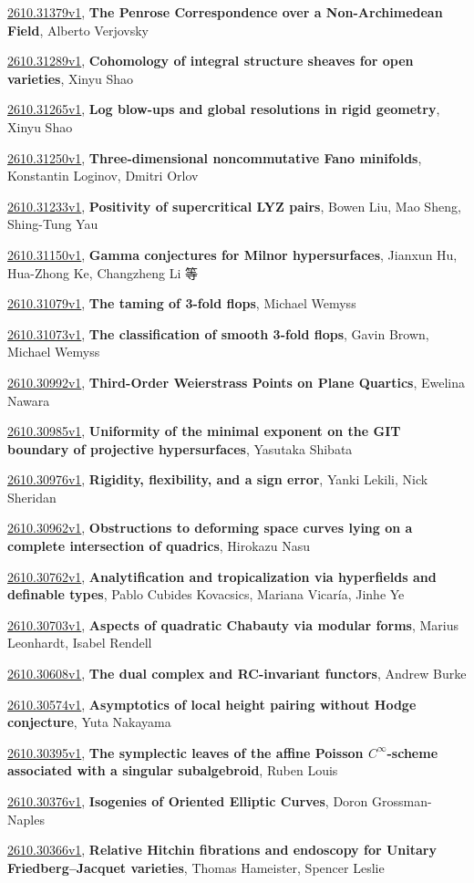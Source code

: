 \documentclass[9pt, a4paper]{article}
\theoremstyle{plain}
\theoremstyle{definition}
\theoremstyle{remark}
\newcommand{\arxiv}[3]{\href{https://arxiv.org/abs/#1}{#1}, \textbf{\textcolor{arxivblue}{#2}}, #3}
\begin{document}
\arxiv{2610.31379v1}{The Penrose Correspondence over a Non-Archimedean Field}{Alberto Verjovsky}

\arxiv{2610.31289v1}{Cohomology of integral structure sheaves for open varieties}{Xinyu Shao}

\arxiv{2610.31265v1}{Log blow-ups and global resolutions in rigid geometry}{Xinyu Shao}

\arxiv{2610.31250v1}{Three-dimensional noncommutative Fano minifolds}{Konstantin Loginov, Dmitri Orlov}

\arxiv{2610.31233v1}{Positivity of supercritical LYZ pairs}{Bowen Liu, Mao Sheng, Shing-Tung Yau}

\arxiv{2610.31150v1}{Gamma conjectures for Milnor hypersurfaces}{Jianxun Hu, Hua-Zhong Ke, Changzheng Li 等}

\arxiv{2610.31079v1}{The taming of 3-fold flops}{Michael Wemyss}

\arxiv{2610.31073v1}{The classification of smooth 3-fold flops}{Gavin Brown, Michael Wemyss}

\arxiv{2610.30992v1}{Third-Order Weierstrass Points on Plane Quartics}{Ewelina Nawara}

\arxiv{2610.30985v1}{Uniformity of the minimal exponent on the GIT boundary of projective hypersurfaces}{Yasutaka Shibata}

\arxiv{2610.30976v1}{Rigidity, flexibility, and a sign error}{Yanki Lekili, Nick Sheridan}

\arxiv{2610.30962v1}{Obstructions to deforming space curves lying on a complete intersection of quadrics}{Hirokazu Nasu}

\arxiv{2610.30762v1}{Analytification and tropicalization via hyperfields and definable types}{Pablo Cubides Kovacsics, Mariana Vicaría, Jinhe Ye}

\arxiv{2610.30703v1}{Aspects of quadratic Chabauty via modular forms}{Marius Leonhardt, Isabel Rendell}

\arxiv{2610.30608v1}{The dual complex and RC-invariant functors}{Andrew Burke}

\arxiv{2610.30574v1}{Asymptotics of local height pairing without Hodge conjecture}{Yuta Nakayama}

\arxiv{2610.30395v1}{The symplectic leaves of the affine Poisson $C^\infty$-scheme associated with a singular subalgebroid}{Ruben Louis}

\arxiv{2610.30376v1}{Isogenies of Oriented Elliptic Curves}{Doron Grossman-Naples}

\arxiv{2610.30366v1}{Relative Hitchin fibrations and endoscopy for Unitary Friedberg--Jacquet varieties}{Thomas Hameister, Spencer Leslie}
\end{document}
